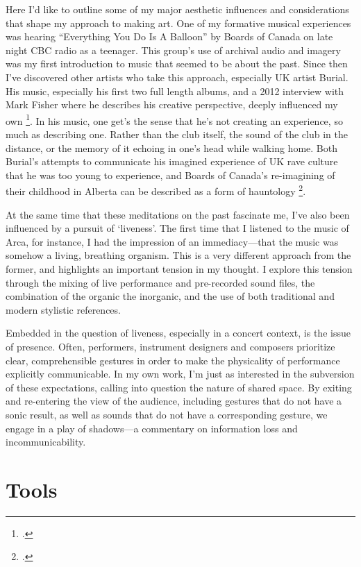 \documentclass[12pt,twoside,maitrise]{dms_ks}
\theoremstyle{definition}
\begin{document}
{Here I'd like to outline some of my major aesthetic influences and considerations that shape my approach to making art. 
One of my formative musical experiences was hearing “Everything You Do Is A Balloon” by Boards of Canada on late night CBC radio as a teenager. 
This group's use of archival audio and imagery was my first introduction to music that seemed to be about the past. 
Since then I've discovered other artists who take this approach, especially UK artist Burial. 
His music, especially his first two full length albums, and a 2012 interview with Mark Fisher where he describes his creative perspective, deeply influenced my own \footcite{fisher_burial_2012}. 
In his music, one get's the sense that he's not creating an experience, so much as describing one. 
Rather than the club itself, the sound of the club in the distance, or the memory of it echoing in one's head while walking home. 
Both Burial's attempts to communicate his imagined experience of UK rave culture that he was too young to experience, and Boards of Canada's re-imagining of their childhood in Alberta can be described as a form of hauntology \footcite{alary_vers_2020}.

At the same time that these meditations on the past fascinate me, I've also been influenced by a pursuit of `liveness'. 
The first time that I listened to the music of Arca, for instance, I had the impression of an immediacy---that the music was somehow a living, breathing organism. 
This is a very different approach from the former, and highlights an important tension in my thought. 
I explore this tension through the mixing of live performance and pre-recorded sound files, the combination of the organic the inorganic, and the use of both traditional and modern stylistic references.

Embedded in the question of liveness, especially in a concert context, is the issue of presence. 
Often, performers, instrument designers and composers prioritize clear, comprehensible gestures in order to make the physicality of performance explicitly communicable. 
In my own work, I'm just as interested in the subversion of these expectations, calling into question the nature of shared space. 
By exiting and re-entering the view of the audience, including gestures that do not have a sonic result, as well as sounds that do not have a corresponding gesture, we engage in a play of shadows---a commentary on information loss and incommunicability. 

\section{Tools}

}
\end{document}
